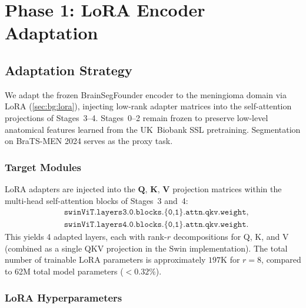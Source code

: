 \section{Phase 1: LoRA Encoder Adaptation}
\label{sec:lora}

\subsection{Adaptation Strategy}
\label{sec:lora:strategy}

We adapt the frozen BrainSegFounder encoder to the meningioma domain via LoRA
(\cref{sec:bg:lora}), injecting low-rank adapter matrices into the
self-attention projections of Stages~3--4. Stages~0--2 remain frozen to
preserve low-level anatomical features learned from the UK~Biobank SSL
pretraining. Segmentation on BraTS-MEN 2024 serves as the proxy task.

\subsubsection{Target Modules}

LoRA adapters are injected into the $\mathbf{Q}$, $\mathbf{K}$, $\mathbf{V}$
projection matrices within the multi-head self-attention blocks of Stages~3
and~4:
\begin{align}
  &\texttt{swinViT.layers3.0.blocks.\{0,1\}.attn.qkv.weight}, \\
  &\texttt{swinViT.layers4.0.blocks.\{0,1\}.attn.qkv.weight}.
\end{align}
This yields 4 adapted layers, each with rank-$r$ decompositions for Q, K,
and V (combined as a single QKV projection in the Swin implementation). The
total number of trainable LoRA parameters is approximately $197\text{K}$ for
$r=8$, compared to 62M total model parameters ($<0.32\%$).

\subsubsection{LoRA Hyperparameters}


